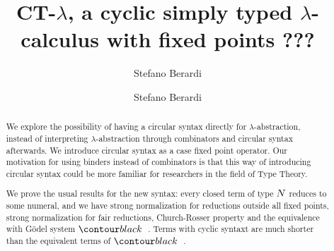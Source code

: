 \ifdraft

\title{CT-$\lambda$, a cyclic simply typed $\lambda$-calculus with fixed points}

\author{Stefano Berardi }
\date{}

\else

\title[Equivalence]
{
???
}

\author[S. Berardi]{Stefano Berardi}
\address{Universit\`{a} di Torino,
Torino, Italy}


\fi

\maketitle

\begin{abstract}
We explore the possibility of having a circular syntax
directly for $\lambda$-abstraction, instead of interpreting
 $\lambda$-abstraction through combinators and circular syntax afterwards.
We introduce circular syntax as a case fixed point operator.
Our motivation for using binders instead of combinators is that this way of introducing circular syntax 
could be more familiar for researchers in the field of Type Theory.

We prove the usual results for the new syntax: 
every closed term of type ${N}$ reduces to some numeral,
and we have strong normalization for reductions outside all fixed points, 
strong normalization for fair reductions, Church-Rosser property
and the equivalence with G\"{o}del system $\systemT$. 
Terms with cyclic syntaxt are much shorter than the equivalent terms of $\systemT$. 
\end{abstract}

\iffalse
key words: 
proof theory,
inductive definitions,
Brotherston-Simpson conjecture,
cyclic proofs,
Martin-Lof's system of inductive definitions,
infinite Ramsey theorem
Podelski-Rybalchenko termination theorem
size-change termination theorem
\fi